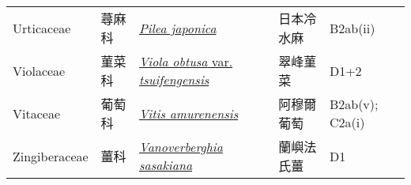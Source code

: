 {\begin{longtable}{L{2.5cm}L{2cm}L{5cm}L{2.5cm}L{3cm}}
    Urticaceae & 蕁麻科 & \href{http://www.theplantlist.org/tpl1.1/search?q=Pilea+japonica}{\textit{Pilea japonica} } & 日本冷水麻 & B2ab(ii)    \\
    Violaceae & 菫菜科 & \href{http://www.theplantlist.org/tpl1.1/search?q=Viola+obtusa+var.+tsuifengensis}{\textit{Viola obtusa} var. \textit{tsuifengensis} } & 翠峰菫菜 & D1+2    \\
    Vitaceae & 葡萄科 & \href{http://www.theplantlist.org/tpl1.1/search?q=Vitis+amurenensis}{\textit{Vitis amurenensis} } & 阿穆爾葡萄 & B2ab(v); C2a(i)    \\
    Zingiberaceae & 薑科 & \href{http://www.theplantlist.org/tpl1.1/search?q=Vanoverberghia+sasakiana}{\textit{Vanoverberghia sasakiana} } & 蘭嶼法氏薑 & D1    \\
    \bottomrule
        \end{longtable}
        }
    